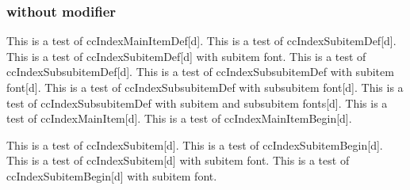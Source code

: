 \documentclass{article}
\begin{document}
{{{{\subsubsection{without modifier}
This is a test of ccIndexMainItemDef[d].
This is a test of ccIndexSubitemDef[d].
This is a test of ccIndexSubitemDef[d] with subitem font.
This is a test of ccIndexSubsubitemDef[d].
This is a test of ccIndexSubsubitemDef with subitem font[d].
This is a test of ccIndexSubsubitemDef with subsubitem font[d].
This is a test of ccIndexSubsubitemDef with subitem and subsubitem fonts[d].
\pagebreak
This is a test of ccIndexMainItem[d].
This is a test of ccIndexMainItemBegin[d].

This is a test of ccIndexSubitem[d].
This is a test of ccIndexSubitemBegin[d].
This is a test of ccIndexSubitem[d] with subitem font.
This is a test of ccIndexSubitemBegin[d] with subitem font.

}}}}
\end{document}
